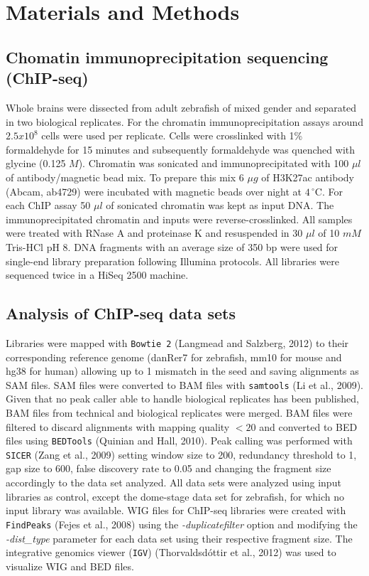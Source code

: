 \section{Materials and Methods}

	\subsection{Chomatin immunoprecipitation sequencing (ChIP-seq)}

		Whole brains were dissected from adult zebrafish of mixed gender and separated in two biological replicates. For the chromatin immunoprecipitation assays around \(2.5x10^{8}\) cells were used per replicate. Cells were crosslinked with 1\% formaldehyde for 15 minutes and subsequently formaldehyde was quenched with glycine (0.125 $M$). Chromatin was sonicated and immunoprecipitated with 100 \(\mu l\) of antibody/magnetic bead mix. To prepare this mix 6 \(\mu g\) of H3K27ac antibody (Abcam, ab4729) were incubated with magnetic beads over night at $4\,^{\circ}\mathrm{C}$. For each ChIP assay 50 \(\mu l\) of sonicated chromatin was kept as input DNA. The immunoprecipitated chromatin and inputs were reverse-crosslinked. All samples were treated with RNase A and proteinase K and resuspended in 30 \(\mu l\) of 10 $mM$ Tris-HCl pH 8. DNA fragments with an average size of 350 bp were used for single-end library preparation following Illumina protocols. All libraries were sequenced twice in a HiSeq 2500 machine.\\

	\subsection{Analysis of ChIP-seq data sets}

		Libraries were mapped with \texttt{Bowtie 2} (Langmead and Salzberg, 2012) to their corresponding reference genome (danRer7 for zebrafish, mm10 for mouse and hg38 for human) allowing up to 1 mismatch in the seed and saving alignments as SAM files. SAM files were converted to BAM files with \texttt{samtools} (Li et al., 2009). Given that no peak caller able to handle biological replicates has been published, BAM files from technical and biological replicates were merged. BAM files were filtered to discard alignments with mapping quality $<20$ and converted to BED files using \texttt{BEDTools} (Quinian and Hall, 2010). Peak calling was performed with \texttt{SICER} (Zang et al., 2009) setting window size to 200, redundancy threshold to 1, gap size to 600, false discovery rate to 0.05 and changing the fragment size accordingly to the data set analyzed. All data sets were analyzed using input libraries as control, except the dome-stage data set for zebrafish, for which no input library was available. WIG files for ChIP-seq libraries were created with \texttt{FindPeaks} (Fejes et al., 2008) using the \textsl{-duplicatefilter} option and modifying the \textsl{-dist\_type} parameter for each data set using their respective fragment size. The integrative genomics viewer (\texttt{IGV}) (Thorvaldsd\'ottir et al., 2012) was used to visualize WIG and BED files.\\

